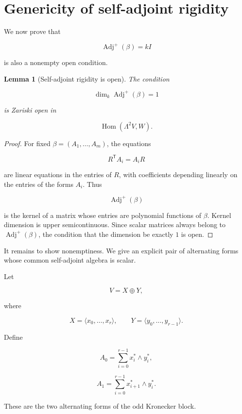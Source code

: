 \documentclass[11pt]{article}
\newtheorem{lemma}[theorem]{Lemma}
\begin{document}
\section{Genericity of self-adjoint rigidity}

We now prove that

\[
\operatorname{Adj}^+(\beta)=kI
\]

is also a nonempty open condition.

\begin{lemma}[Self-adjoint rigidity is open]

The condition

\[
\dim_k\operatorname{Adj}^+(\beta)=1
\]

is Zariski open in

\[
\operatorname{Hom}(\Lambda^2V,W).
\]

\end{lemma}

\begin{proof}

For fixed $\beta=(A_1,\ldots,A_m)$, the equations

\[
R^{\mathsf T}A_i=A_iR
\]

are linear equations in the entries of $R$, with coefficients depending linearly on the entries of the forms $A_i$. Thus

\[
\operatorname{Adj}^+(\beta)
\]

is the kernel of a matrix whose entries are polynomial functions of $\beta$. Kernel dimension is upper semicontinuous. Since scalar matrices always belong to $\operatorname{Adj}^+(\beta)$, the condition that the dimension be exactly $1$ is open.

\end{proof}

It remains to show nonemptiness. We give an explicit pair of alternating forms whose common self-adjoint algebra is scalar.

Let

\[
V=X\oplus Y,
\]

where

\[
X=\langle x_0,\ldots,x_r\rangle,
\qquad
Y=\langle y_0,\ldots,y_{r-1}\rangle.
\]

Define

\[
A_0=\sum_{i=0}^{r-1}x_i^*\wedge y_i^*,
\]

\[
A_1=\sum_{i=0}^{r-1}x_{i+1}^*\wedge y_i^*.
\]

These are the two alternating forms of the odd Kronecker block.
\end{document}
